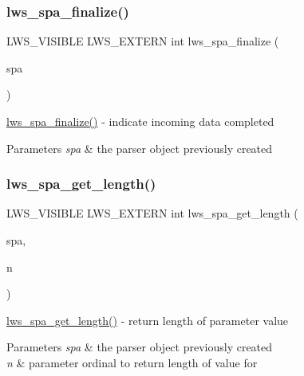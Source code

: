 \subsubsection{\texorpdfstring{lws\+\_\+spa\+\_\+finalize()}{lws\_spa\_finalize()}}
{\footnotesize\ttfamily L\+W\+S\+\_\+\+V\+I\+S\+I\+B\+LE L\+W\+S\+\_\+\+E\+X\+T\+E\+RN int lws\+\_\+spa\+\_\+finalize (\begin{DoxyParamCaption}\item[{struct lws\+\_\+spa $\ast$}]{spa }\end{DoxyParamCaption})}

\hyperlink{group__form-parsing_ga83835bf250ee3d4a60f36a182f2b8d24}{lws\+\_\+spa\+\_\+finalize()} -\/ indicate incoming data completed


\begin{DoxyParams}{Parameters}
{\em spa} & the parser object previously created \\
\hline
\end{DoxyParams}
\mbox{\label{group__form-parsing_ga3fbe378632f85ec9a14cc2c1687bf05f}} 
\subsubsection{\texorpdfstring{lws\+\_\+spa\+\_\+get\+\_\+length()}{lws\_spa\_get\_length()}}
{\footnotesize\ttfamily L\+W\+S\+\_\+\+V\+I\+S\+I\+B\+LE L\+W\+S\+\_\+\+E\+X\+T\+E\+RN int lws\+\_\+spa\+\_\+get\+\_\+length (\begin{DoxyParamCaption}\item[{struct lws\+\_\+spa $\ast$}]{spa,  }\item[{int}]{n }\end{DoxyParamCaption})}

\hyperlink{group__form-parsing_ga3fbe378632f85ec9a14cc2c1687bf05f}{lws\+\_\+spa\+\_\+get\+\_\+length()} -\/ return length of parameter value


\begin{DoxyParams}{Parameters}
{\em spa} & the parser object previously created \\
\hline
{\em n} & parameter ordinal to return length of value for \\
\hline
\end{DoxyParams}
\mbox{\label{group__form-parsing_ga00907a35dcf7f97b16cf961cece6a6fa}} 
